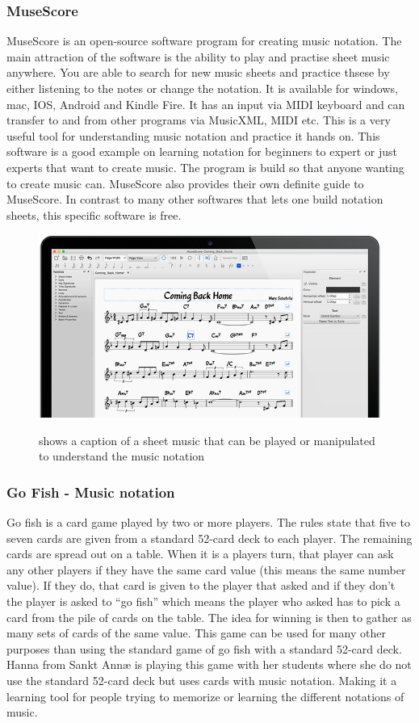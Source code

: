 \subsubsection{MuseScore}
MuseScore is an open-source software program for creating music notation. The main attraction of the software is the ability to play and practise sheet music anywhere. You are able to search for new music sheets and practice thsese by either listening to the notes or change the notation. It is available for windows, mac, IOS, Android and Kindle Fire. It has an input via MIDI keyboard and can transfer to and from other programs via MusicXML, MIDI etc. This is a very useful tool for understanding music notation and practice it hands on. This software is a good example on learning notation for beginners to expert or just experts that want to create music. The program is build so that anyone wanting to create music can. MuseScore also provides their own definite guide to MuseScore. In contrast to many other softwares that lets one build notation sheets, this specific software is free. \cite{MuseScore}

\begin{figure}[H]
	\centering
	\includegraphics[width=0.8\linewidth]{figure/Analysis/musescore.png}
	\label{fig:MuseScore}
	\caption{shows a caption of a sheet music that can be played or manipulated to understand the music notation \cite{MuseScore}}
\end{figure}

\subsubsection{Go Fish - Music notation} 
Go fish is a card game played by two or more players. The rules state that five to seven cards are given from a standard 52-card deck to each player. The remaining cards are spread out on a table. When it is a players turn, that player can ask any other players if they have the same card value (this means the same number value). If they do, that card is given to the player that asked and if they don’t the player is asked to “go fish” which means the player who asked has to pick a card from the pile of cards on the table. The idea for winning is then to gather as many sets of cards of the same value. This game can be used for many other purposes than using the standard game of go fish with a standard 52-card deck. Hanna from Sankt Annæ is playing this game with her students where she do not use the standard 52-card deck but uses cards with music notation. Making it a learning tool for people trying to memorize or learning the different notations of music. \cite{GoFish}

